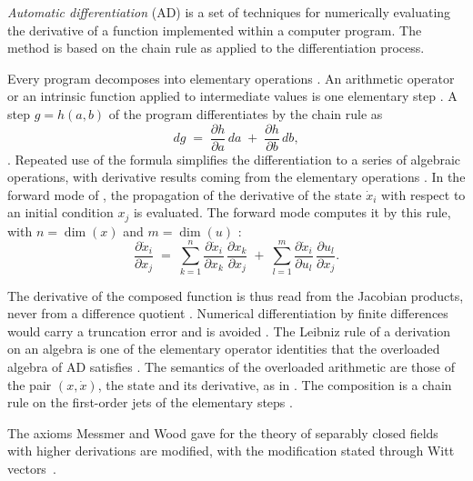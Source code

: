 \begin{definition}\label{def:app:autodiff}
\emph{Automatic differentiation} (AD) is a set of techniques for numerically
evaluating the derivative of a function implemented within a computer
program. The method is based on the chain rule as applied to the
differentiation process.
\end{definition}

Every program decomposes into elementary operations
\cite[\S II.B]{YuanThomsonAnderson2020}. An arithmetic operator or
an intrinsic function applied to intermediate values is one elementary step
\cite[\S II.B]{YuanThomsonAnderson2020}. A step $g=h(a,b)$ of the program
differentiates by the chain rule as
\[
dg \;=\; \frac{\partial h}{\partial a}\,da \;+\; \frac{\partial h}{\partial b}\,db,
\]
\cite[equation (2)]{YuanThomsonAnderson2020}. Repeated use of the formula
simplifies the differentiation to a series of algebraic operations, with
derivative results coming from the elementary operations
\cite[\S II.B]{YuanThomsonAnderson2020}. In the forward mode of \cite[\S II.B]{YuanThomsonAnderson2020},
the propagation of the derivative of the state $\dot x_i$ with respect to an
initial condition $x_j$ is evaluated. The forward mode computes it by this rule, with $n=\dim(x)$ and $m=\dim(u)$
\cite[equation (3)]{YuanThomsonAnderson2020}:
\[
\frac{\partial \dot x_i}{\partial x_j}
\;=\;
\sum_{k=1}^{n}\frac{\partial \dot x_i}{\partial x_k}\,
\frac{\partial x_k}{\partial x_j}
\;+\;
\sum_{l=1}^{m}\frac{\partial \dot x_i}{\partial u_l}\,
\frac{\partial u_l}{\partial x_j}.
\]

The derivative of the composed function is thus read from the Jacobian
products, never from a difference quotient \cite[Introduction,
p.~2]{YuanThomsonAnderson2020}. Numerical differentiation by finite
differences would carry a truncation error and is avoided \cite[Introduction,
p.~2]{YuanThomsonAnderson2020}. The Leibniz rule of a derivation on an algebra
is one of the elementary operator identities that the overloaded algebra of AD
satisfies \cite[\S II.B]{YuanThomsonAnderson2020}. The semantics of the
overloaded arithmetic are those of the pair $(x,\dot x)$, the state and its
derivative, as in \cite[\S II.B]{YuanThomsonAnderson2020}. The composition is
a chain rule on the first-order jets of the elementary steps \cite[equations
(2)--(3)]{YuanThomsonAnderson2020}. %

The axioms Messmer and Wood gave for the theory of separably closed fields
with higher derivations are modified, with the modification stated through
Witt vectors~\cite{WlWittVectorsAndSeparablyClosedF2019}.

